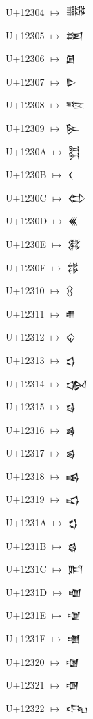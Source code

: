 {\noindent U+12304  $\mapsto$ {\cufont 𒌄}\par
\noindent U+12305  $\mapsto$ {\cufont 𒌅}\par
\noindent U+12306  $\mapsto$ {\cufont 𒌆}\par
\noindent U+12307  $\mapsto$ {\cufont 𒌇}\par
\noindent U+12308  $\mapsto$ {\cufont 𒌈}\par
\noindent U+12309  $\mapsto$ {\cufont 𒌉}\par
\noindent U+1230A  $\mapsto$ {\cufont 𒌊}\par
\noindent U+1230B  $\mapsto$ {\cufont 𒌋}\par
\noindent U+1230C  $\mapsto$ {\cufont 𒌌}\par
\noindent U+1230D  $\mapsto$ {\cufont 𒌍}\par
\noindent U+1230E  $\mapsto$ {\cufont 𒌎}\par
\noindent U+1230F  $\mapsto$ {\cufont 𒌏}\par
\noindent U+12310  $\mapsto$ {\cufont 𒌐}\par
\noindent U+12311  $\mapsto$ {\cufont 𒌑}\par
\noindent U+12312  $\mapsto$ {\cufont 𒌒}\par
\noindent U+12313  $\mapsto$ {\cufont 𒌓}\par
\noindent U+12314  $\mapsto$ {\cufont 𒌔}\par
\noindent U+12315  $\mapsto$ {\cufont 𒌕}\par
\noindent U+12316  $\mapsto$ {\cufont 𒌖}\par
\noindent U+12317  $\mapsto$ {\cufont 𒌗}\par
\noindent U+12318  $\mapsto$ {\cufont 𒌘}\par
\noindent U+12319  $\mapsto$ {\cufont 𒌙}\par
\noindent U+1231A  $\mapsto$ {\cufont 𒌚}\par
\noindent U+1231B  $\mapsto$ {\cufont 𒌛}\par
\noindent U+1231C  $\mapsto$ {\cufont 𒌜}\par
\noindent U+1231D  $\mapsto$ {\cufont 𒌝}\par
\noindent U+1231E  $\mapsto$ {\cufont 𒌞}\par
\noindent U+1231F  $\mapsto$ {\cufont 𒌟}\par
\noindent U+12320  $\mapsto$ {\cufont 𒌠}\par
\noindent U+12321  $\mapsto$ {\cufont 𒌡}\par
\noindent U+12322  $\mapsto$ {\cufont 𒌢}\par
}
